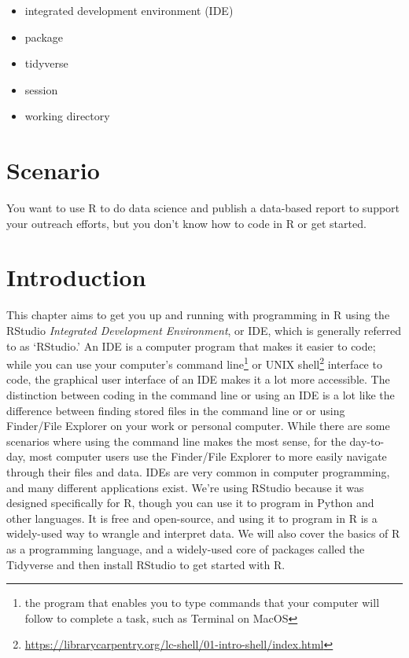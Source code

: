 \documentclass[
  krantz2]{krantz}
\providecommand{\tightlist}{%
  \setlength{\itemsep}{0pt}\setlength{\parskip}{0pt}}
\begin{document}
\begin{itemize}
\tightlist
\item
  integrated development environment (IDE)
\item
  package
\item
  tidyverse
\item
  session
\item
  working directory
\end{itemize}

\hypertarget{rstudio-scenario}{%
\section{Scenario}\label{rstudio-scenario}}

You want to use R to do data science and publish a data-based report to support your outreach efforts, but you don't know how to code in R or get started.

\hypertarget{rstudio-intro}{%
\section{Introduction}\label{rstudio-intro}}

This chapter aims to get you up and running with programming in R using the RStudio \emph{Integrated Development Environment}, or IDE, which is generally referred to as `RStudio.' An IDE is a computer program that makes it easier to code; while you can use your computer's command line\footnote{the program that enables you to type commands that your computer will follow to complete a task, such as Terminal on MacOS} or UNIX shell\footnote{\url{https://librarycarpentry.org/lc-shell/01-intro-shell/index.html}} interface to code, the graphical user interface of an IDE makes it a lot more accessible. The distinction between coding in the command line or using an IDE is a lot like the difference between finding stored files in the command line or or using Finder/File Explorer on your work or personal computer. While there are some scenarios where using the command line makes the most sense, for the day-to-day, most computer users use the Finder/File Explorer to more easily navigate through their files and data. IDEs are very common in computer programming, and many different applications exist. We're using RStudio because it was designed specifically for R, though you can use it to program in Python and other languages. It is free and open-source, and using it to program in R is a widely-used way to wrangle and interpret data. We will also cover the basics of R as a programming language, and a widely-used core of packages called the Tidyverse and then install RStudio to get started with R.
\end{document}
